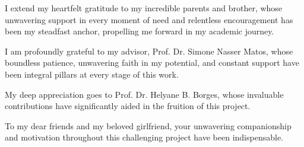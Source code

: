 \begin{Acknowledgments}
I extend my heartfelt gratitude to my incredible parents and brother, whose unwavering support in every moment of need and relentless encouragement has been my steadfast anchor, propelling me forward in my academic journey.

I am profoundly grateful to my advisor, Prof. Dr. Simone Nasser Matos, whose boundless patience, unwavering faith in my potential, and constant support have been integral pillars at every stage of this work. 

My deep appreciation goes to Prof. Dr. Helyane B. Borges, whose invaluable contributions have significantly aided in the fruition of this project.

To my dear friends and my beloved girlfriend, your unwavering companionship and motivation throughout this challenging project have been indispensable. 
\end{Acknowledgments}
